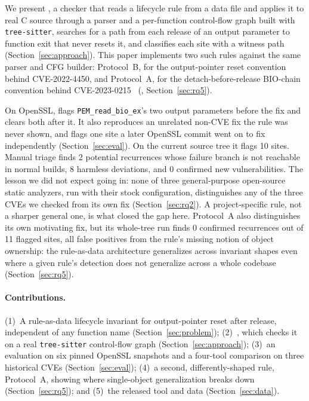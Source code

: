 We present \tool, a checker that reads a lifecycle rule from a data file
and applies it to real C source through a parser and a per-function
control-flow graph built with \texttt{tree-sitter}, searches for a path
from each release of an output parameter to function exit that never
resets it, and classifies each site with a witness path
(Section~\ref{sec:approach}). This paper implements two such rules against the same parser and CFG
builder: Protocol~B, for the output-pointer reset convention behind
CVE-2022-4450, and Protocol~A, for the detach-before-release BIO-chain
convention behind CVE-2023-0215~\cite{nvd2023cve0215} (, Section~\ref{sec:rq5}).

On OpenSSL, \tool flags \texttt{PEM\_read\_bio\_ex}'s two output
parameters before the fix and clears both after it. It also reproduces an
unrelated non-CVE fix the rule was never shown, and flags one site a
later OpenSSL commit went on to fix independently
(Section~\ref{sec:eval}). On the current source tree it flags 10 sites.
Manual triage finds 2 potential recurrences whose failure branch is not
reachable in normal builds, 8 harmless deviations, and 0
confirmed new vulnerabilities. The lesson we did not expect going in:
none of three general-purpose open-source static analyzers, run with
their stock configuration, distinguishes any of the three CVEs we
checked from its own fix (Section~\ref{sec:rq2}). A project-specific
rule, not a sharper general one, is what closed the gap here. Protocol~A
also distinguishes its own motivating fix, but its whole-tree run finds
0 confirmed recurrences out of 11 flagged sites, all false positives from
the rule's missing notion of object ownership: the rule-as-data
architecture generalizes across invariant shapes even where a given
rule's detection does not generalize across a whole codebase
(Section~\ref{sec:rq5}).

\paragraph{Contributions.} (1)~A rule-as-data lifecycle invariant for
output-pointer reset after release, independent of any function name
(Section~\ref{sec:problem}); (2)~\tool, which checks it on a real
\texttt{tree-sitter} control-flow graph (Section~\ref{sec:approach});
(3)~an evaluation on six pinned OpenSSL snapshots and a four-tool
comparison on three historical CVEs (Section~\ref{sec:eval}); (4)~a second,
differently-shaped rule, Protocol~A, showing where single-object
generalization breaks down (Section~\ref{sec:rq5}); and (5)~the released
tool and data (Section~\ref{sec:data}).

